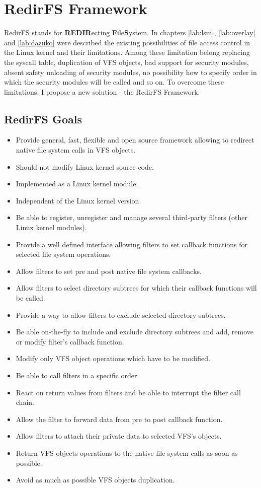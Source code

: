 \chapter{RedirFS Framework}
RedirFS stands for \textbf{REDIR}ecting \textbf{F}ile\textbf{S}ystem. In
chapters \ref{lab:lsm}, \ref{lab:overlay} and \ref{lab:dazuko} were described
the existing
possibilities of file access control in the Linux kernel and their limitations. Among
these limitation belong replacing the syscall table, duplication of VFS objects, bad
support for security modules, absent safety unloading of security modules, no
possibility how to specify order in which the security modules will be called and so on.
To overcome these limitations, I propose a new solution - the RedirFS Framework.

\section{RedirFS Goals}

\begin{itemize}
	\item Provide general, fast, flexible and open source framework allowing to
		redirect native file system calls in VFS objects.
	\item Should not modify Linux kernel source code. 
	\item Implemented as a Linux kernel module.
	\item Independent of the Linux kernel version.
	\item Be able to register, unregister and manage several third-party filters
		(other Linux kernel modules).
	\item Provide a well defined interface allowing filters to set callback
		functions for selected file system operations.
	\item Allow filters to set pre and post native file system callbacks.
	\item Allow filters to select directory subtrees for which their callback
		functions will be called.
	\item Provide a way to allow filters to exclude selected directory
		subtrees.
	\item Be able on-the-fly to include and exclude directory subtrees and add, remove
		or modify filter's callback function.
	\item Modify only VFS object operations which have to be modified.
	\item Be able to call filters in a specific order.
	\item React on return values from filters and be able to interrupt the filter call
		chain.
	\item Allow the filter to forward data from pre to post callback function. 
	\item Allow filters to attach their private data to selected VFS's
		objects.
	\item Return VFS objects operations to the native file system calls as soon as
		possible.
	\item Avoid as much as possible VFS objects duplication.

\end{itemize}

